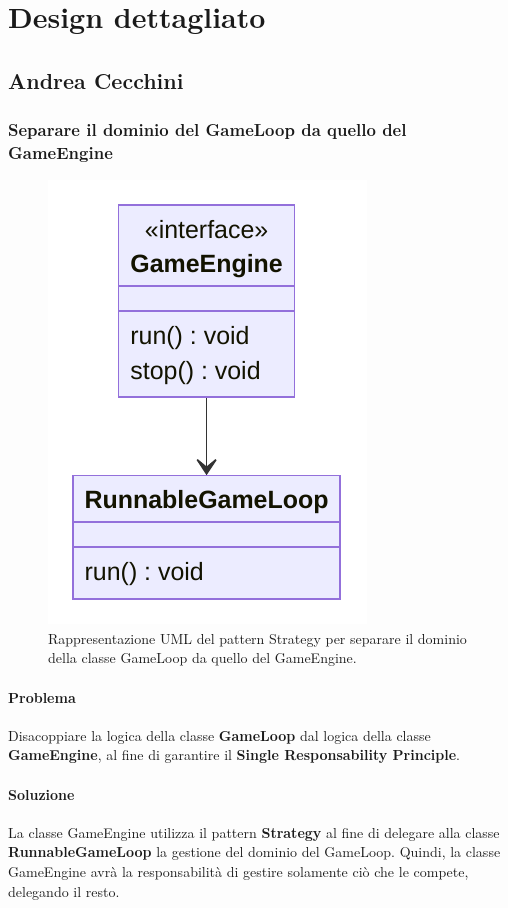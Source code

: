 \documentclass[a4paper,12pt]{report}
\begin{document}
\section{Design dettagliato}
%
\subsection*{Andrea Cecchini}
%
\subsubsection*{Separare il dominio del GameLoop da quello del GameEngine}
%
\begin{figure}[H]
	\centering{}
	\includegraphics[scale=0.75]{img/GameEngineAndGameLoop.pdf}
	\caption{Rappresentazione UML del pattern Strategy per separare il dominio della classe GameLoop da quello del GameEngine.}
	\label{img:strategy}
	\end{figure}
%
\paragraph*{Problema} Disacoppiare la logica della classe \textbf{GameLoop} dal logica della classe \textbf{GameEngine}, al fine di garantire il \textbf{Single Responsability Principle}.
%
\paragraph*{Soluzione} La classe GameEngine utilizza il pattern \textbf{Strategy} al fine di delegare alla classe \textbf{RunnableGameLoop} la gestione del dominio del GameLoop. 
Quindi, la classe GameEngine avrà la responsabilità di gestire solamente ciò che le compete, delegando il resto.
%
\end{document}
